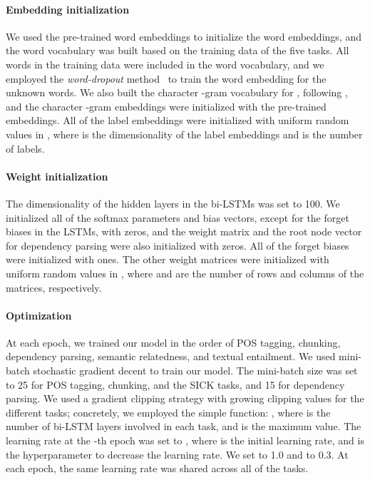 \documentclass[11pt,a4paper]{article}
\begin{document}
\paragraph{Embedding initialization}
We used the pre-trained word embeddings to initialize the word embeddings, and the word vocabulary was built based on the training data of the five tasks.
All words in the training data were included in the word vocabulary, and we employed the {\it word-dropout} method~\citep{kiperwasser2016} to train the word embedding for the unknown words.
We also built the character -gram vocabulary for , following \citet{wieting2016}, and the character -gram embeddings were initialized with the pre-trained embeddings.
All of the label embeddings were initialized with uniform random values in , where  is the dimensionality of the label embeddings and  is the number of labels.

\paragraph{Weight initialization}
The dimensionality of the hidden layers in the bi-LSTMs was set to 100.
We initialized all of the softmax parameters and bias vectors, except for the forget biases in the LSTMs, with zeros, and the weight matrix  and the root node vector  for dependency parsing were also initialized with zeros.
All of the forget biases were initialized with ones.
The other weight matrices were initialized with uniform random values in , where  and  are the number of rows and columns of the matrices, respectively.

\paragraph{Optimization}
At each epoch, we trained our model in the order of POS tagging, chunking, dependency parsing, semantic relatedness, and textual entailment.
We used mini-batch stochastic gradient decent to train our model.
The mini-batch size was set to 25 for POS tagging, chunking, and the SICK tasks, and 15 for dependency parsing.
We used a gradient clipping strategy with growing clipping values for the different tasks; concretely, we employed the simple function: , where  is the number of bi-LSTM layers involved in each task, and  is the maximum value.
The learning rate at the -th epoch was set to , where  is the initial learning rate, and  is the hyperparameter to decrease the learning rate.
We set  to 1.0 and  to 0.3.
At each epoch, the same learning rate was shared across all of the tasks.
\end{document}
